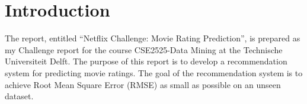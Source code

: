 \documentclass{ece}
\begin{document}

\maketitle


\tableofcontents


\listoftables


\body

\section{Introduction}

The report, entitled ``Netflix Challenge: Movie Rating Prediction'', is prepared as my Challenge report for the course CSE2525-Data Mining at the Technische Universiteit Delft.
The purpose of this report is to develop a recommendation system for predicting movie ratings.
The goal of the recommendation system is to achieve Root Mean Square Error (RMSE) as small as possible on an unseen dataset.
\end{document}
